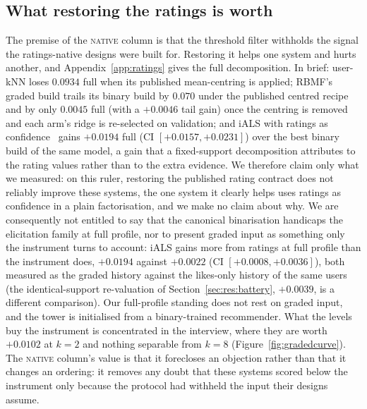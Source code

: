 \documentclass[manuscript,screen]{acmart}
\begin{document}
\subsection{What restoring the ratings is worth}\label{sec:ratings}
The premise of the \textsc{native} column is that the threshold filter withholds the signal the ratings-native designs were built for. Restoring it helps one system and hurts another, and Appendix~\ref{app:ratings} gives the full decomposition. In brief: user-kNN loses $0.0934$ full when its published mean-centring is applied; RBMF's graded build trails its binary build by $0.070$ under the published centred recipe and by only $0.0045$ full (with a $+0.0046$ tail gain) once the centring is removed and each arm's ridge is re-selected on validation; and iALS with ratings as confidence~\citep{hu2008collaborative} gains $+0.0194$ full (CI $[+0.0157,+0.0231]$) over the best binary build of the same model, a gain that a fixed-support decomposition attributes to the rating values rather than to the extra evidence. We therefore claim only what we measured: on this ruler, restoring the published rating contract does not reliably improve these systems, the one system it clearly helps uses ratings as confidence in a plain factorisation, and we make no claim about why. We are consequently not entitled to say that the canonical binarisation handicaps the elicitation family at full profile, nor to present graded input as something only the instrument turns to account: iALS gains more from ratings at full profile than the instrument does, $+0.0194$ against $+0.0022$ (CI $[+0.0008,+0.0036]$), both measured as the graded history against the likes-only history of the same users (the identical-support re-valuation of Section~\ref{sec:res:battery}, $+0.0039$, is a different comparison). Our full-profile standing does not rest on graded input, and the tower is initialised from a binary-trained recommender. What the levels buy the instrument is concentrated in the interview, where they are worth $+0.0102$ at $k{=}2$ and nothing separable from $k{=}8$ (Figure~\ref{fig:gradedcurve}). The \textsc{native} column's value is that it forecloses an objection rather than that it changes an ordering: it removes any doubt that these systems scored below the instrument only because the protocol had withheld the input their designs assume.
\end{document}
